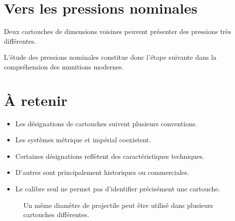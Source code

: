 \section{Vers les pressions nominales}

Deux cartouches de dimensions voisines peuvent présenter des pressions très
différentes.

L'étude des pressions nominales constitue donc l'étape suivante dans la
compréhension des munitions modernes.

\section{À retenir}

\begin{aretenir}

\begin{itemize}
    \item Les désignations de cartouches suivent plusieurs conventions.
    \item Les systèmes métrique et impérial coexistent.
    \item Certaines désignations reflètent des caractéristiques techniques.
    \item D'autres sont principalement historiques ou commerciales.
    \item Le calibre seul ne permet pas d'identifier précisément une
          cartouche.
\end{itemize}

\end{aretenir}

\begin{figure}[htbp]
\centering


\caption{Un même diamètre de projectile peut être utilisé dans plusieurs cartouches différentes.}
\label{fig:famille_308}

\end{figure}

